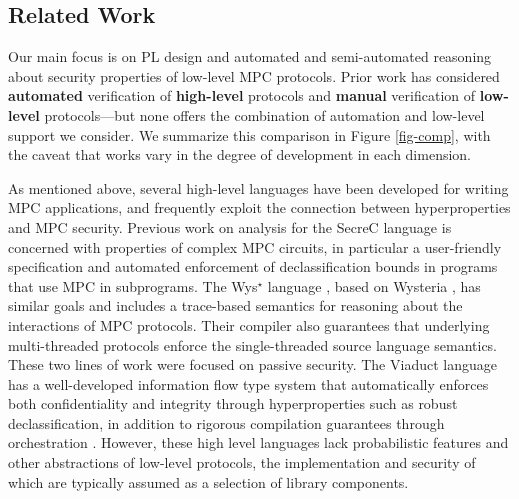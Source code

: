 \compfig

\subsection{Related Work}
\label{section-related-work}

Our main focus is on PL design and automated and semi-automated
reasoning about security properties of low-level MPC protocols. Prior
work has considered \textbf{automated} verification of
\textbf{high-level} protocols and \textbf{manual} verification of
\textbf{low-level} protocols---but none offers the combination of
automation and low-level support we consider.
%
We summarize this comparison in Figure
\ref{fig-comp}, with the caveat that works vary in the degree of
development in each dimension.


As mentioned above, several high-level languages have been developed
for writing MPC applications, and frequently exploit the connection
between hyperproperties and MPC security. Previous work on analysis
for the SecreC language
\cite{almeida2018enforcing,10.1145/2637113.2637119} is concerned with
properties of complex MPC circuits, in particular a user-friendly
specification and automated enforcement of declassification bounds in
programs that use MPC in subprograms. The Wys$^\star$ language
\cite{wysstar}, based on Wysteria \cite{rastogi2014wysteria}, has
similar goals and includes a trace-based semantics for reasoning about
the interactions of MPC protocols. Their compiler also guarantees that
underlying multi-threaded protocols enforce the single-threaded source
language semantics. These two lines of work were focused on passive
security. The Viaduct language
\cite{10.1145/3453483.3454074} has a well-developed
information flow type system that automatically enforces both
confidentiality and integrity through hyperproperties such as robust
declassification, in addition to rigorous compilation guarantees
through orchestration \cite{viaduct-UC}. However, these high level
languages lack probabilistic features and other abstractions of
low-level protocols, the implementation and security of which are
typically assumed as a selection of library components.

